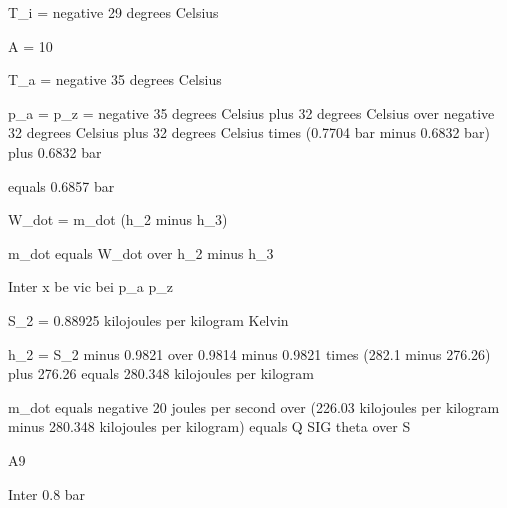 T_i = negative 29 degrees Celsius

A = 10

T_a = negative 35 degrees Celsius

p_a = p_z = negative 35 degrees Celsius plus 32 degrees Celsius over negative 32 degrees Celsius plus 32 degrees Celsius times (0.7704 bar minus 0.6832 bar) plus 0.6832 bar

equals 0.6857 bar

W_dot = m_dot (h_2 minus h_3)

m_dot equals W_dot over h_2 minus h_3

Inter x be vic bei p_a p_z

S_2 = 0.88925 kilojoules per kilogram Kelvin

h_2 = S_2 minus 0.9821 over 0.9814 minus 0.9821 times (282.1 minus 276.26) plus 276.26 equals 280.348 kilojoules per kilogram

m_dot equals negative 20 joules per second over (226.03 kilojoules per kilogram minus 280.348 kilojoules per kilogram) equals Q SIG theta over S

A9

Inter 0.8 bar